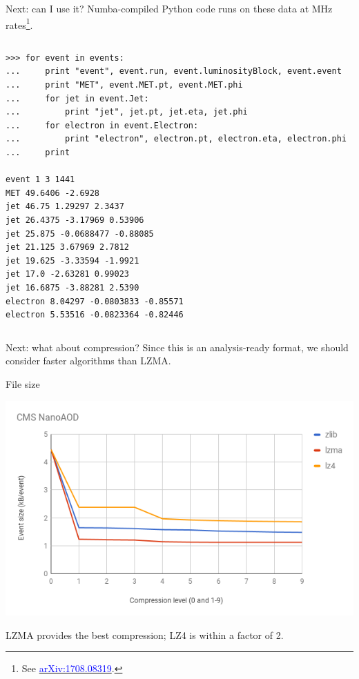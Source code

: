 \documentclass{beamer}
\begin{document}
\begin{frame}[fragile]{Next: can I use it?}
Numba-compiled Python code runs on these data at MHz rates\footnote{See \href{https://arxiv.org/abs/1708.08319}{\textcolor{blue}{arXiv:1708.08319}}.}.

\begin{columns}
\scriptsize
\begin{verbatim}
>>> for event in events:
...     print "event", event.run, event.luminosityBlock, event.event
...     print "MET", event.MET.pt, event.MET.phi
...     for jet in event.Jet:
...         print "jet", jet.pt, jet.eta, jet.phi
...     for electron in event.Electron:
...         print "electron", electron.pt, electron.eta, electron.phi
...     print

event 1 3 1441
MET 49.6406 -2.6928
jet 46.75 1.29297 2.3437
jet 26.4375 -3.17969 0.53906
jet 25.875 -0.0688477 -0.88085
jet 21.125 3.67969 2.7812
jet 19.625 -3.33594 -1.9921
jet 17.0 -2.63281 0.99023
jet 16.6875 -3.88281 2.5390
electron 8.04297 -0.0803833 -0.85571
electron 5.53516 -0.0823364 -0.82446                                                    
\end{verbatim}
\end{columns}
\end{frame}

\begin{frame}{Next: what about compression?}
\vspace{0.5 cm}
Since this is an analysis-ready format, we should consider faster algorithms than LZMA.

\vspace{1 cm}

\vspace{1 cm}
\end{frame}

\begin{frame}{File size}
\begin{center}
\includegraphics[width=\linewidth]{size-vs-compression.png}
\end{center}

LZMA provides the best compression; LZ4 is within a factor of 2.
\vspace{\baselineskip}
\end{frame}
\end{document}
